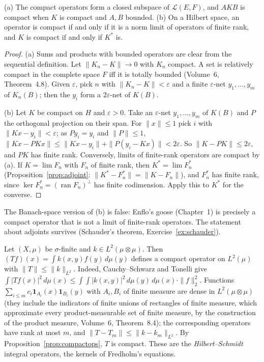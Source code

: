 \begin{proposition}\label{prop:compactops}
(a) The compact operators form a closed subspace of $\mathcal L(E,F)$, and $AKB$ is compact when $K$ is compact and $A,B$ bounded. (b) On a Hilbert space, an operator is compact if and only if it is a norm limit of operators of finite rank, and
$K$ is compact if and only if $K^*$ is.
\end{proposition}
\begin{proof}
(a) Sums and products with bounded operators are clear from the sequential definition. Let $\|K_n-K\|\to0$ with $K_n$ compact. A set is relatively compact in the complete space $F$ iff it is totally bounded (Volume~6, Theorem~4.8). Given
$\varepsilon$, pick $n$ with $\|K_n-K\|<\varepsilon$ and a finite $\varepsilon$-net $y_1,\dots,y_m$ of $K_n(B)$; then the $y_i$ form a $2\varepsilon$-net of $K(B)$.

(b) Let $K$ be compact on $H$ and $\varepsilon>0$. Take an $\varepsilon$-net $y_1,\dots,y_m$ of $K(B)$ and $P$ the orthogonal projection on their span. For $\|x\|\le1$ pick $i$ with $\|Kx-y_i\|<\varepsilon$; as $Py_i=y_i$ and $\|P\|\le1$,
$\|Kx-PKx\|\le\|Kx-y_i\|+\|P(y_i-Kx)\|<2\varepsilon$. So $\|K-PK\|\le2\varepsilon$, and $PK$ has finite rank. Conversely, limits of finite-rank operators are compact by (a). If $K=\lim F_n$ with $F_n$ of finite rank, then
$K^*=\lim F_n^*$ (Proposition~\ref{prop:adjoint}: $\|K^*-F_n^*\|=\|K-F_n\|$), and $F_n^*$ has finite rank, since $\ker F_n^*=(\operatorname{ran}F_n)^\perp$ has finite codimension. Apply this to $K^*$ for the converse.
\end{proof}

The Banach-space version of (b) is false: Enflo's goose (Chapter~1) is precisely a compact operator that is not a limit of finite-rank operators. The statement about adjoints survives (Schauder's theorem, Exercise~\ref{ex:schauder}).

\begin{example}\label{ex:hilbertschmidt}
Let $(X,\mu)$ be $\sigma$-finite and $k\in L^2(\mu\otimes\mu)$. Then $(Tf)(x)=\int k(x,y)f(y)\,d\mu(y)$ defines a compact operator on $L^2(\mu)$ with $\|T\|\le\|k\|_{L^2}$. Indeed, Cauchy--Schwarz and Tonelli give
$\int|Tf(x)|^2\,d\mu(x)\le\int\!\!\int|k(x,y)|^2\,d\mu(y)\,d\mu(x)\cdot\|f\|_2^2$. Functions $\sum_{i\le m}c_i\mathbf 1_{A_i}(x)\mathbf 1_{B_i}(y)$ with $A_i,B_i$ of finite measure are dense in $L^2(\mu\otimes\mu)$ (they include the indicators of
finite unions of rectangles of finite measure, which approximate every product-measurable set of finite measure, by the construction of the product measure, Volume~6, Theorem~8.4); the corresponding operators have rank at most
$m$, and $\|T-T_m\|\le\|k-k_m\|_{L^2}$. By Proposition~\ref{prop:compactops}, $T$ is compact. These are the \emph{Hilbert--Schmidt} integral operators, the kernels of Fredholm's equations.
\end{example}

